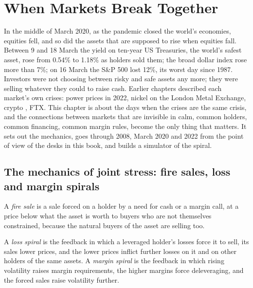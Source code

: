\chapter{When Markets Break Together}\label{ch:m3:when-markets-break-together}

In the middle of March 2020, as the pandemic closed the world's economies, equities fell, and so did the
assets that are supposed to rise when equities fall. Between 9 and 18 March the yield on ten-year US
Treasuries, the world's safest asset, rose from 0.54\% to 1.18\% as holders sold them; the broad dollar
index rose more than 7\%; on 16 March the S\&P 500 lost 12\%, its worst day since 1987. Investors were
not choosing between risky and safe assets any more; they were selling whatever they could to raise cash.
Earlier chapters described each market's own crises: power prices in 2022, nickel on the London Metal
Exchange, crypto , FTX. This chapter is about the days when the crises are the same
crisis, and the connections between markets that are invisible in calm, common holders, common
financing, common margin rules, become the only thing that matters. It sets out the mechanics, goes
through 2008, March 2020 and 2022 from the point of view of the desks in this book, and builds a
simulator of the spiral.

\section{The mechanics of joint stress: fire sales, loss and margin spirals}

\begin{definition}\label{def:m3:when-markets-break-together:fire}
A \emph{fire sale} is a sale forced on a holder by a need for cash or a margin call, at a price below what the asset is
worth to buyers who are not themselves constrained, because the natural buyers of the asset are selling too.
\end{definition}

\begin{definition}\label{def:m3:when-markets-break-together:spirals}
A \emph{loss spiral} is the feedback in which a leveraged holder's losses force it to sell, its sales lower prices, and the
lower prices inflict further losses on it and on other holders of the same assets. A \emph{margin spiral} is the feedback
in which rising volatility raises margin requirements, the higher margins force deleveraging, and the forced sales raise volatility further.
\end{definition}

